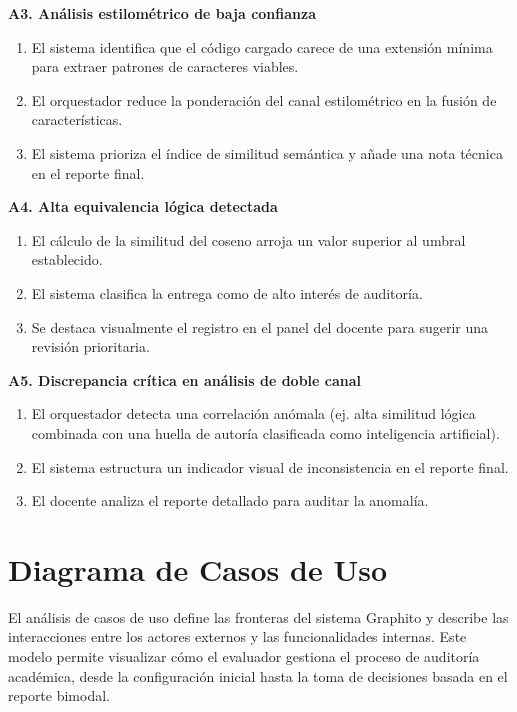 \textbf{A3. Análisis estilométrico de baja confianza}

\begin{enumerate}
	\item El sistema identifica que el código cargado carece de una extensión mínima para extraer patrones de caracteres viables.
	\item El orquestador reduce la ponderación del canal estilométrico en la fusión de características.
	\item El sistema prioriza el índice de similitud semántica y añade una nota técnica en el reporte final.
\end{enumerate}

\textbf{A4. Alta equivalencia lógica detectada}

\begin{enumerate}
	\item El cálculo de la similitud del coseno arroja un valor superior al umbral establecido.
	\item El sistema clasifica la entrega como de alto interés de auditoría.
	\item Se destaca visualmente el registro en el panel del docente para sugerir una revisión prioritaria.
\end{enumerate}

\textbf{A5. Discrepancia crítica en análisis de doble canal}

\begin{enumerate}
	\item El orquestador detecta una correlación anómala (ej. alta similitud lógica combinada con una huella de autoría clasificada como inteligencia artificial).
	\item El sistema estructura un indicador visual de inconsistencia en el reporte final.
	\item El docente analiza el reporte detallado para auditar la anomalía.
\end{enumerate}

\section{Diagrama de Casos de Uso}

El análisis de casos de uso define las fronteras del sistema Graphito y describe las interacciones entre los actores externos y las funcionalidades internas. Este modelo permite visualizar cómo el evaluador gestiona el proceso de auditoría académica, desde la configuración inicial hasta la toma de decisiones basada en el reporte bimodal.

